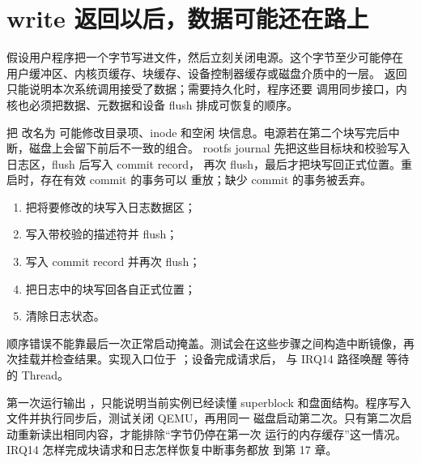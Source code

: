 \section{write 返回以后，数据可能还在路上}

假设用户程序把一个字节写进文件，然后立刻关闭电源。这个字节至少可能停在
用户缓冲区、内核页缓存、块缓存、设备控制器缓存或磁盘介质中的一层。
 返回只能说明本次系统调用接受了数据；需要持久化时，程序还要
调用同步接口，内核也必须把数据、元数据和设备 flush 排成可恢复的顺序。

\begin{center}
\end{center}

把  改名为  可能修改目录项、inode 和空闲
块信息。电源若在第二个块写完后中断，磁盘上会留下前后不一致的组合。
rootfs journal 先把这些目标块和校验写入日志区，flush 后写入 commit record，
再次 flush，最后才把块写回正式位置。重启时，存在有效 commit 的事务可以
重放；缺少 commit 的事务被丢弃。

\begin{enumerate}[label=\arabic*.]
  \item 把将要修改的块写入日志数据区；
  \item 写入带校验的描述符并 flush；
  \item 写入 commit record 并再次 flush；
  \item 把日志中的块写回各自正式位置；
  \item 清除日志状态。
\end{enumerate}

顺序错误不能靠最后一次正常启动掩盖。测试会在这些步骤之间构造中断镜像，再
次挂载并检查结果。实现入口位于
；设备完成请求后，
 与 IRQ14 路径唤醒
等待的 Thread。

第一次运行输出 ，只能说明当前实例已经读懂
superblock 和盘面结构。程序写入文件并执行同步后，测试关闭 QEMU，再用同一
磁盘启动第二次。只有第二次启动重新读出相同内容，才能排除“字节仍停在第一次
运行的内存缓存”这一情况。IRQ14 怎样完成块请求和日志怎样恢复中断事务都放
到第 17 章。
